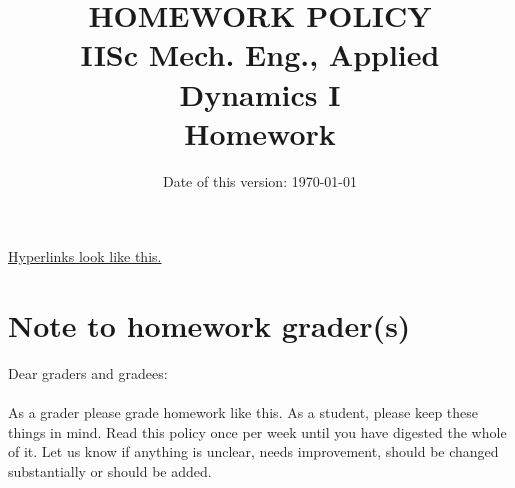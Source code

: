 \documentclass[11pt]{article}
\title{\vskip -1in HOMEWORK POLICY\\
IISc Mech. Eng., Applied Dynamics I \\
\textbf{Homework} }
\date{Date of this version:  \today}
\begin{document}
\maketitle

\noindent
\href{http://en.wikipedia.org/wiki/Hyperlink}{\color{blue}Hyperlinks look like this.}
 

\label{sec:homework}

\section{Note to homework grader(s)}
Dear graders and gradees:\\ \\
As a grader please grade homework like this. As a student, please keep these things in mind. Read this policy once per week until you have digested the whole of it.  Let us know if anything is unclear, needs improvement, should be changed substantially or should be added.
\end{document}
